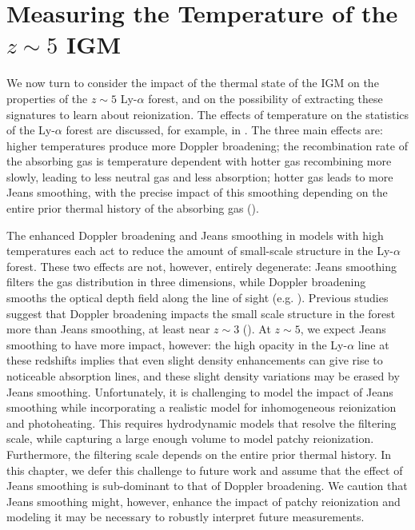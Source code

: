 \section{Measuring the Temperature of the $z \sim 5$ IGM}
\label{sec:IGMTemperaturetemp_measure}

We now turn to consider the impact of the thermal state of the IGM on the properties of the $z \sim 5$ Ly-$\alpha$ 
forest, and
on the possibility of extracting these signatures to learn about reionization. The effects of temperature
on the statistics of the Ly-$\alpha$ forest are discussed, for example, in \citet{Lidz:2009ca}. The three main effects 
are: higher temperatures produce more Doppler broadening; the recombination rate of the absorbing gas is temperature
dependent with hotter gas recombining more slowly, leading to less neutral gas and less absorption; hotter gas leads
to more Jeans smoothing, with the precise impact of this smoothing depending on the entire prior thermal history of the absorbing gas
(\citealt{Gnedin:1997td}). 

The enhanced Doppler broadening and Jeans smoothing in models with high temperatures each act to reduce the amount of small-scale structure in the Ly-$\alpha$ forest.
These two effects are not, however, entirely degenerate: Jeans smoothing filters the gas distribution in three dimensions, while
Doppler broadening smooths the optical depth field along the line of sight 
(e.g. \citealt{Zaldarriaga:2000mz}). Previous studies suggest that Doppler broadening impacts the small scale structure in the
forest more than Jeans smoothing, at least near $z \sim 3$ (\citealt{Zaldarriaga:2000mz,Peeples:2009ue,Lidz:2009ca}). At $z \sim 5$, we 
expect Jeans smoothing to have more impact, however: the high opacity in the Ly-$\alpha$ line at these redshifts implies that even slight
density enhancements can give rise to noticeable absorption lines, and these slight density variations may be erased by Jeans
smoothing. Unfortunately, it is challenging to model the impact of Jeans smoothing while incorporating a realistic model
for inhomogeneous reionization and photoheating. This requires hydrodynamic models that resolve the filtering scale, while capturing
a large enough volume to model patchy reionization. Furthermore, the filtering scale depends on the entire prior thermal history. 
In this chapter, we defer this challenge to future work and assume that the effect of Jeans smoothing is sub-dominant
to that of Doppler broadening. We caution that Jeans smoothing might, however, enhance the impact of patchy reionization and 
modeling it may be necessary to robustly interpret future measurements. 

